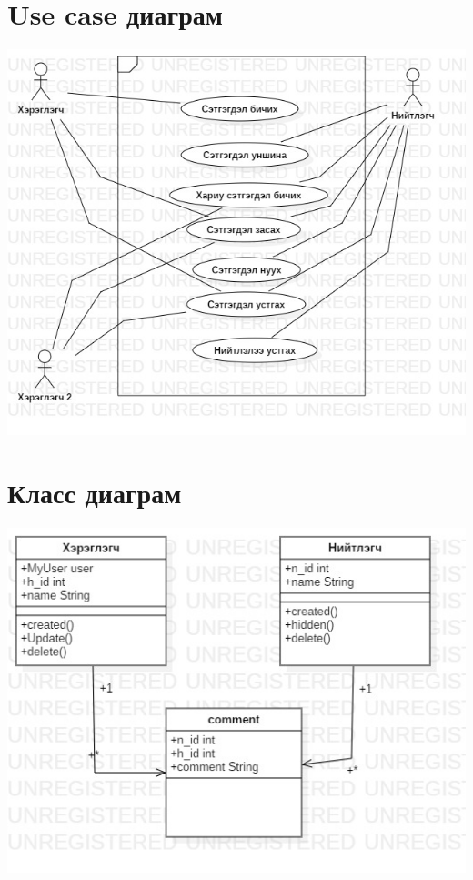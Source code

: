 \documentclass[12pt]{article}
\begin{document}
 \section{Use case диаграм}
		\includegraphics[scale=0.5]{UseCaseDiagram} 
 
 \section{Класс диаграм}
 \includegraphics[scale=0.5]{commentclass} 
 
\end{document}
